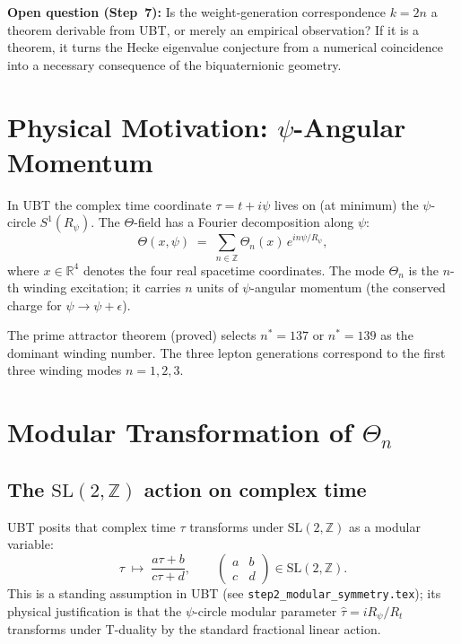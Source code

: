 \documentclass[12pt,a4paper]{article}
\theoremstyle{definition}
\theoremstyle{remark}
\begin{document}
\begin{gapbox}
\textbf{Open question (Step~7):} Is the weight-generation correspondence
$k = 2n$ a theorem derivable from UBT, or merely an empirical observation?
If it is a theorem, it turns the Hecke eigenvalue conjecture from a numerical
coincidence into a necessary consequence of the biquaternionic geometry.
\end{gapbox}

\section{Physical Motivation: $\psi$-Angular Momentum}
\label{sec:psi_angular_momentum}

In UBT the complex time coordinate $\tau = t + i\psi$ lives on (at minimum)
the $\psi$-circle $S^1(R_\psi)$.  The $\Theta$-field has a Fourier decomposition
along $\psi$:
\begin{equation}
  \Theta(x, \psi)
  \;=\; \sum_{n \in \mathbb{Z}} \Theta_n(x)\,e^{in\psi/R_\psi},
  \label{eq:fourier_decomp}
\end{equation}
where $x \in \mathbb{R}^4$ denotes the four real spacetime coordinates.
The mode $\Theta_n$ is the $n$-th winding excitation; it carries
$n$ units of $\psi$-angular momentum (the conserved charge for
$\psi \to \psi + \epsilon$).

The prime attractor theorem (proved) selects $n^* = 137$ or $n^* = 139$
as the dominant winding number.  The three lepton generations correspond
to the first three winding modes $n = 1, 2, 3$.

\section{Modular Transformation of $\Theta_n$}
\label{sec:modular_transform}

\subsection{The $\mathrm{SL}(2,\mathbb{Z})$ action on complex time}

UBT posits that complex time $\tau$ transforms under
$\mathrm{SL}(2,\mathbb{Z})$ as a modular variable:
\begin{equation}
  \tau \;\longmapsto\; \frac{a\tau + b}{c\tau + d},
  \qquad
  \begin{pmatrix} a & b \\ c & d \end{pmatrix} \in \mathrm{SL}(2,\mathbb{Z}).
  \label{eq:mobius}
\end{equation}
This is a standing assumption in UBT (see
\texttt{step2\_modular\_symmetry.tex}); its physical justification is that
the $\psi$-circle modular parameter $\hat\tau = iR_\psi/R_t$ transforms
under T-duality by the standard fractional linear action.
\end{document}
